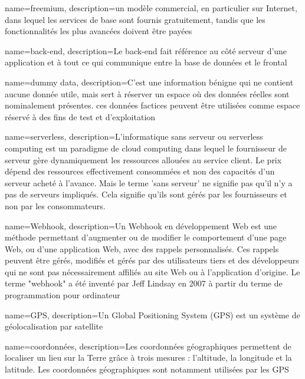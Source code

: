 \makeglossaries
 
{
    name=freemium,
    description={un modèle commercial, en particulier sur Internet, dans lequel les services de base sont fournis gratuitement, tandis que les fonctionnalités les plus avancées doivent être payées}
}

{
    name=back-end,
    description={Le back-end fait référence au côté serveur d'une application et à tout ce qui communique entre la base de données et le frontal}
}

{
    name=dummy data,
    description={C'est une information bénigne qui ne contient aucune donnée utile, mais sert à réserver un espace où des données réelles sont nominalement présentes. ces données factices peuvent être utilisées comme espace réservé à des fins de test et d'exploitation}
}

{
    name=serverless,
    description={L'informatique sans serveur ou serverless computing est un paradigme de cloud computing dans lequel le fournisseur de serveur gère dynamiquement les ressources allouées au service client. Le prix dépend des ressources effectivement consommées et non des capacités d'un serveur acheté à l'avance. Mais le terme 'sans serveur' ne signifie pas qu'il n'y a pas de serveurs impliqués. Cela signifie qu'ils sont gérés par les fournisseurs et non par les consommateurs.\cite{noauthor_informatique_nodate}}
}

{
    name=Webhook,
    description={Un Webhook en développement Web est une méthode permettant d’augmenter ou de modifier le comportement d’une page Web, ou d’une application Web, avec des rappels personnalisés. Ces rappels peuvent être gérés, modifiés et gérés par des utilisateurs tiers et des développeurs qui ne sont pas nécessairement affiliés au site Web ou à l'application d'origine. Le terme "webhook" a été inventé par Jeff Lindsay en 2007 à partir du terme de programmation pour ordinateur\cite{noauthor_webhook_2019}}
}

{
    name=GPS,
    description={Un Global Positioning System (GPS) est un système de géolocalisation par satellite}
}

{
    name=coordonnées,
    description={Les coordonnées géographiques permettent de localiser un lieu sur la Terre grâce à trois mesures : l'altitude, la longitude et la latitude. Les coordonnées géographiques sont notamment utilisées par les GPS}
}

